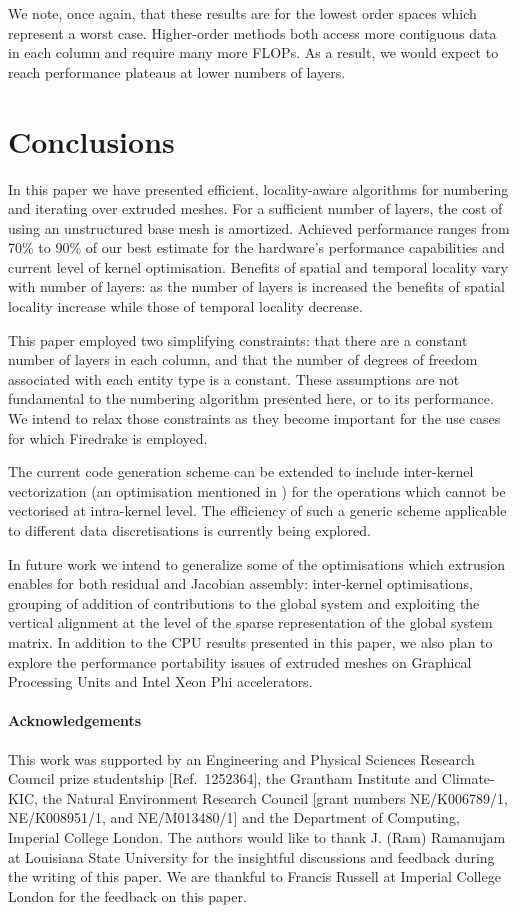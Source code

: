 \documentclass[11pt, a4paper]{scrartcl}
\begin{document}
We note, once again, that these results are for the lowest order
spaces which represent a worst case.  Higher-order methods both access
more contiguous data in each column and require many more FLOPs.  As a
result, we would expect to reach performance plateaus at lower numbers
of layers.

\section{Conclusions}
\label{sec:conclusions}
In this paper we have presented efficient, locality-aware algorithms
for numbering and iterating over extruded meshes. For a sufficient
number of layers, the cost of using an unstructured base mesh is
amortized. Achieved performance ranges from 70\% to 90\% of our best
estimate for the hardware's performance capabilities and current level
of kernel optimisation.  Benefits of spatial and temporal locality
vary with number of layers: as the number of layers is increased the
benefits of spatial locality increase while those of temporal locality
decrease.

This paper employed two simplifying constraints: that there are a
constant number of layers in each column, and that the number of
degrees of freedom associated with each entity type is a
constant. These assumptions are not fundamental to the numbering
algorithm presented here, or to its performance.  We intend to relax
those constraints as they become important for the use cases for which
Firedrake is employed.

The current code generation scheme can be extended to include
inter-kernel vectorization (an optimisation mentioned in
\citet{Meister:2015}) for the operations which cannot be vectorised at
intra-kernel level. The efficiency of such a generic scheme applicable
to different data discretisations is currently being explored.

In future work we intend to generalize some of the optimisations which
extrusion enables for both residual and Jacobian assembly:
inter-kernel optimisations, grouping of addition of contributions to
the global system and exploiting the vertical alignment at the level
of the sparse representation of the global system matrix. In addition
to the CPU results presented in this paper, we also plan to explore
the performance portability issues of extruded meshes on Graphical
Processing Units and Intel Xeon Phi accelerators.

\appendix
\paragraph{Acknowledgements}
This work was supported by an Engineering and Physical Sciences
Research Council prize studentship [Ref.\ 1252364], the Grantham
Institute and Climate-KIC, the Natural Environment Research Council
[grant numbers NE/K006789/1, NE/K008951/1, and NE/M013480/1] and the
Department of Computing, Imperial College London. The authors would
like to thank J. (Ram) Ramanujam at Louisiana State University for the
insightful discussions and feedback during the writing of this
paper. We are thankful to Francis Russell at Imperial College London
for the feedback on this paper.
\end{document}
